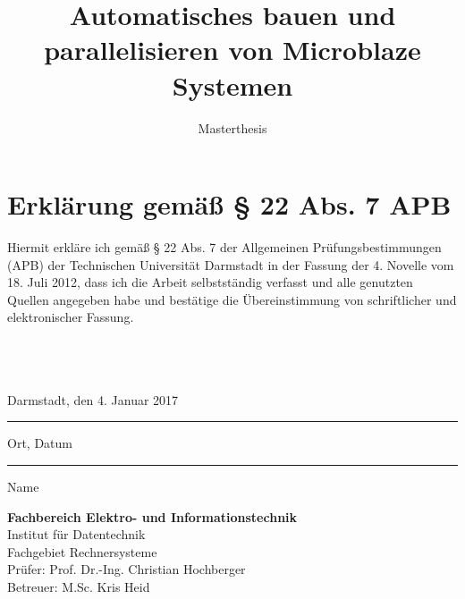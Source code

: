 \documentclass[accentcolor=tud1c,colorback,ngerman,12pt] {tudreport}
\begin{document}
\title{Automatisches bauen und parallelisieren von Microblaze Systemen}
\subtitle{Masterthesis}

\maketitle
\chapter*{Erklärung gemäß § 22 Abs. 7 APB}

Hiermit erkläre ich gemäß § 22 Abs. 7 der Allgemeinen Prüfungsbestimmungen (APB) der Technischen Universität Darmstadt in der Fassung der 4. Novelle vom 18. Juli 2012, dass ich die Arbeit selbstständig verfasst und alle genutzten Quellen angegeben habe und bestätige die Übereinstimmung von schriftlicher und elektronischer Fassung.\\ \\ \\ \\

\parbox{8cm}{\centering Darmstadt, den 4. Januar 2017\hrule
\strut \centering\footnotesize Ort, Datum} \hfill\parbox{8cm}{\phantom{Darmstadt, den 4. Januar 2017} \hrule
\strut \centering\footnotesize Name}

\vfill

\noindent \textbf{Fachbereich Elektro- und Informationstechnik}\\
Institut für Datentechnik\\
Fachgebiet Rechnersysteme\\
Prüfer: Prof. Dr.-Ing. Christian Hochberger\\
Betreuer: M.Sc. Kris Heid

\tableofcontents




%




\end{document}
